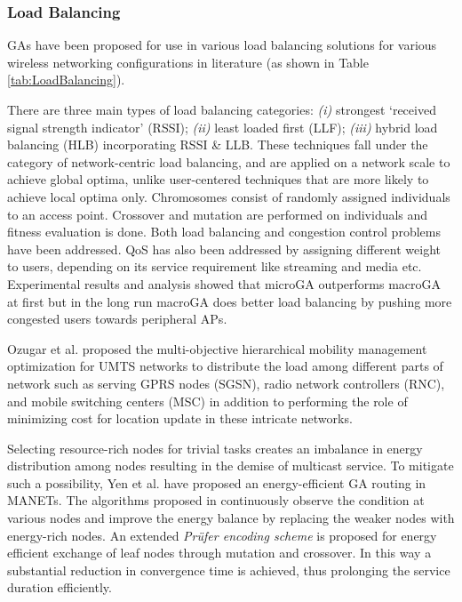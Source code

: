 \documentclass[journal]{IEEEtran}
\begin{document}
\vspace{2mm}
\subsubsection{Load Balancing}
\label{sec:LoadBalancing}

GAs have been proposed for use in various load balancing solutions for various wireless networking configurations in literature (as shown in Table \ref{tab:LoadBalancing}).

There are three main types of load balancing categories: \emph{(i)} strongest `received signal strength indicator' (RSSI); \emph{(ii)} least loaded first (LLF); \emph{(iii)} hybrid load balancing (HLB) incorporating RSSI \&  LLB. These techniques fall under the category of network-centric load balancing, and are applied on a network scale to achieve global optima, unlike user-centered techniques that are more likely to achieve local optima only. Chromosomes consist of randomly assigned individuals to an access point. Crossover and mutation are performed on individuals and fitness evaluation is done. Both load balancing and congestion control problems have been addressed. QoS has also been addressed by assigning different weight to users, depending on its service requirement like streaming and media etc. Experimental results and analysis showed that microGA outperforms macroGA at first but in the long run macroGA does better load balancing by pushing more congested users towards peripheral APs.

Ozugar et al. \cite{ozugur2001multiobjective} proposed the multi-objective hierarchical mobility management optimization for UMTS networks to distribute the load among different parts of network such as serving GPRS nodes (SGSN), radio network controllers (RNC), and mobile switching centers (MSC) in addition to performing the role of minimizing cost for location update in these intricate networks.

Selecting resource-rich nodes for trivial tasks creates an imbalance in energy distribution among nodes resulting in the demise of multicast service. To mitigate such a possibility, Yen et al. \cite{yen2008genetic} have proposed an energy-efficient GA routing in MANETs. The algorithms proposed in \cite{yen2008genetic} continuously observe the condition at various nodes and improve the energy balance by replacing the weaker nodes with energy-rich nodes. An extended \emph{Pr\"ufer encoding scheme} is proposed for energy efficient exchange of leaf nodes through mutation and crossover. In this way a substantial reduction in convergence time is achieved, thus prolonging the service duration efficiently.
\end{document}
